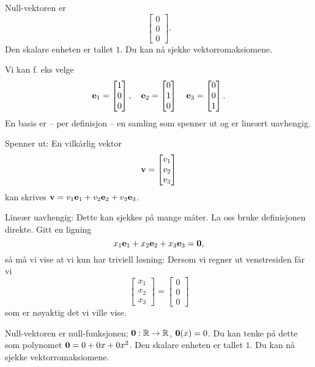 \begin{losning}

\begin{punkt}
Null-vektoren er $$\begin{bmatrix}
0\\
0\\
0
\end{bmatrix}.$$ Den skalare enheten er tallet $1$. Du kan nå sjekke vektorromaksiomene.
\end{punkt}

\begin{punkt}
Vi kan f. eks velge $$\mathbf{e}_1=\begin{bmatrix}
1\\
0\\
0
\end{bmatrix}, \quad \mathbf{e}_2=\begin{bmatrix}
0\\
1\\
0
\end{bmatrix} \quad \mathbf{e}_3=\begin{bmatrix}
0\\
0\\
1
\end{bmatrix}.$$ En basis er -- per definisjon -- en samling som spenner ut og er lineært uavhengig.

\noindent
Spenner ut: En vilkårlig vektor $$\mathbf{v}=\begin{bmatrix}
v_1\\
v_2\\
v_3
\end{bmatrix}$$ kan skrives $\mathbf{v}=v_1\mathbf{e}_1+v_2\mathbf{e}_2+v_3\mathbf{e}_3$.

\noindent
Lineær uavhengig: Dette kan sjekkes på mange måter. La oss bruke definisjonen direkte. Gitt en ligning $$x_1\mathbf{e}_1+x_2\mathbf{e}_2+x_3\mathbf{e}_3=\mathbf{0},$$ så må vi vise at vi kun har triviell løsning: Dersom vi regner ut venstresiden får vi $$\begin{bmatrix}
x_1\\
x_2\\
x_3
\end{bmatrix}=\begin{bmatrix}
0\\
0\\
0
\end{bmatrix}$$ som er nøyaktig det vi ville vise.
\end{punkt}

\begin{punkt}
Null-vektoren er null-funksjonen; $\mathbf{0}:\mathbb{R}\rightarrow \mathbb{R}$, $\mathbf{0}(x)=0$. Du kan tenke på dette som polynomet $\mathbf{0}=0+0x+0x^2$. Den skalare enheten er tallet $1$. Du kan nå sjekke vektorromaksiomene.
\end{punkt}


\end{losning}
